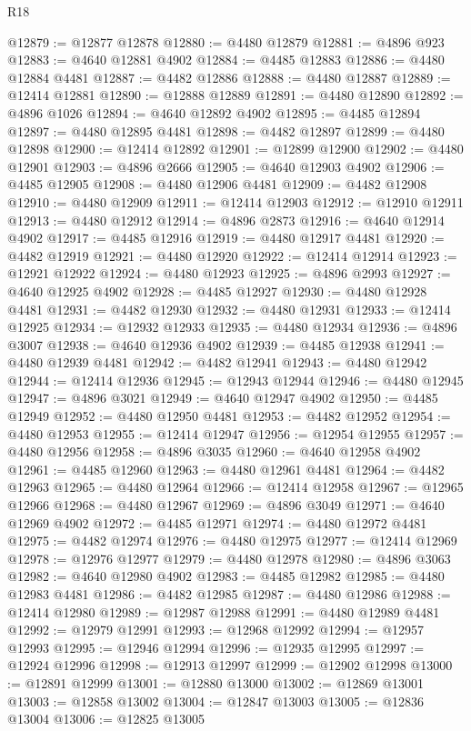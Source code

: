 \begin{lexlean}{R18}
\begin{coremodule}
@12879 := @12877 @12878
@12880 := @4480 @12879
@12881 := @4896 @923
@12883 := @4640 @12881 @4902
@12884 := @4485 @12883
@12886 := @4480 @12884 @4481
@12887 := @4482 @12886
@12888 := @4480 @12887
@12889 := @12414 @12881
@12890 := @12888 @12889
@12891 := @4480 @12890
@12892 := @4896 @1026
@12894 := @4640 @12892 @4902
@12895 := @4485 @12894
@12897 := @4480 @12895 @4481
@12898 := @4482 @12897
@12899 := @4480 @12898
@12900 := @12414 @12892
@12901 := @12899 @12900
@12902 := @4480 @12901
@12903 := @4896 @2666
@12905 := @4640 @12903 @4902
@12906 := @4485 @12905
@12908 := @4480 @12906 @4481
@12909 := @4482 @12908
@12910 := @4480 @12909
@12911 := @12414 @12903
@12912 := @12910 @12911
@12913 := @4480 @12912
@12914 := @4896 @2873
@12916 := @4640 @12914 @4902
@12917 := @4485 @12916
@12919 := @4480 @12917 @4481
@12920 := @4482 @12919
@12921 := @4480 @12920
@12922 := @12414 @12914
@12923 := @12921 @12922
@12924 := @4480 @12923
@12925 := @4896 @2993
@12927 := @4640 @12925 @4902
@12928 := @4485 @12927
@12930 := @4480 @12928 @4481
@12931 := @4482 @12930
@12932 := @4480 @12931
@12933 := @12414 @12925
@12934 := @12932 @12933
@12935 := @4480 @12934
@12936 := @4896 @3007
@12938 := @4640 @12936 @4902
@12939 := @4485 @12938
@12941 := @4480 @12939 @4481
@12942 := @4482 @12941
@12943 := @4480 @12942
@12944 := @12414 @12936
@12945 := @12943 @12944
@12946 := @4480 @12945
@12947 := @4896 @3021
@12949 := @4640 @12947 @4902
@12950 := @4485 @12949
@12952 := @4480 @12950 @4481
@12953 := @4482 @12952
@12954 := @4480 @12953
@12955 := @12414 @12947
@12956 := @12954 @12955
@12957 := @4480 @12956
@12958 := @4896 @3035
@12960 := @4640 @12958 @4902
@12961 := @4485 @12960
@12963 := @4480 @12961 @4481
@12964 := @4482 @12963
@12965 := @4480 @12964
@12966 := @12414 @12958
@12967 := @12965 @12966
@12968 := @4480 @12967
@12969 := @4896 @3049
@12971 := @4640 @12969 @4902
@12972 := @4485 @12971
@12974 := @4480 @12972 @4481
@12975 := @4482 @12974
@12976 := @4480 @12975
@12977 := @12414 @12969
@12978 := @12976 @12977
@12979 := @4480 @12978
@12980 := @4896 @3063
@12982 := @4640 @12980 @4902
@12983 := @4485 @12982
@12985 := @4480 @12983 @4481
@12986 := @4482 @12985
@12987 := @4480 @12986
@12988 := @12414 @12980
@12989 := @12987 @12988
@12991 := @4480 @12989 @4481
@12992 := @12979 @12991
@12993 := @12968 @12992
@12994 := @12957 @12993
@12995 := @12946 @12994
@12996 := @12935 @12995
@12997 := @12924 @12996
@12998 := @12913 @12997
@12999 := @12902 @12998
@13000 := @12891 @12999
@13001 := @12880 @13000
@13002 := @12869 @13001
@13003 := @12858 @13002
@13004 := @12847 @13003
@13005 := @12836 @13004
@13006 := @12825 @13005

\end{coremodule}
\end{lexlean}
